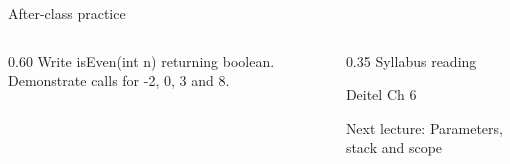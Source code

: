 \documentclass[10pt,aspectratio=169]{beamer}
\begin{document}
\begin{frame}[fragile,t]{After-class practice}
\begin{columns}[T,onlytextwidth]\begin{column}{0.60\textwidth}
Write isEven(int n) returning boolean. Demonstrate calls for -2, 0, 3 and 8.
\end{column}\begin{column}{0.35\textwidth}\small
Syllabus reading\par Deitel Ch 6

Next lecture: Parameters, stack and scope
\end{column}\end{columns}
\end{frame}
\end{document}
